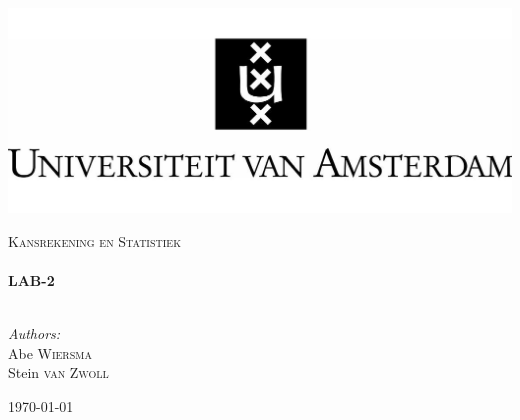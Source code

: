 \begin{titlepage}

\begin{flushleft}
\includegraphics[trim=23mm 0mm 0mm 0mm, width=1\textwidth]{./logo.jpg}\\[1cm] \end{flushleft}
\begin{center}
	\textsc{\Large Kansrekening en Statistiek}\\[0.5cm]

    \HRule \\[0.4cm] { \huge \bfseries LAB-2}\\[0.4cm]

    \HRule \\[1.5cm]

\begin{minipage}{0.4\textwidth}
\begin{flushleft} \large \emph{Authors:}\\
Abe \textsc{Wiersma}\\
Stein \textsc{van Zwoll}\\
\end{flushleft}
\end{minipage}
\begin{minipage}{0.4\textwidth} \begin{flushright} \large \end{flushright}\end{minipage}

    \vfill

    {\large \today}

\end{center}
\end{titlepage}
\pagebreak